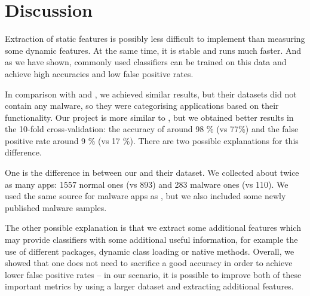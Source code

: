 \section{Discussion}
Extraction of static features is possibly less difficult to implement than measuring some dynamic features. At the same time, it is stable and runs much faster. And as we have shown, commonly used classifiers can be trained on this data and achieve high accuracies and low false positive rates.

In comparison with \cite{shabtai_2010} and \cite{sanz_2012}, we achieved similar results, but their datasets did not contain any malware, so they were categorising applications based on their functionality. Our project is more similar to \cite{kim_malicious}, but we obtained better results in the 10-fold cross-validation: the accuracy of around 98 \% (vs 77\%) and the false positive rate around 9 \% (vs 17 \%). There are two possible explanations for this difference.

One is the difference in between our and their dataset. We collected about twice as many apps: 1557 normal ones (vs 893) and 283 malware ones (vs 110). We used the same source for malware apps as \cite{kim_malicious}, but we also included some newly published malware samples.

The other possible explanation is that we extract some additional features which may provide classifiers with some additional useful information, for example the use of different packages, dynamic class loading or native methods. Overall, we showed that one does not need to sacrifice a good accuracy in order to achieve lower false positive rates -- in our scenario, it is possible to improve both of these important metrics by using a larger dataset and extracting additional features.